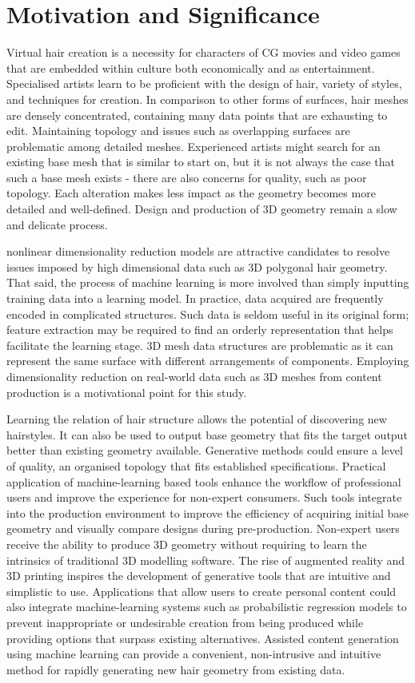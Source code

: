 \documentclass[ %
author={Dillon Keith Diep},
supervisor={Dr. Carl Henrik Ek},
degree={MEng},
title={ART-CG Hair:},
subtitle={Assisted Real-time Content Generation of Stylised Virtual Hair},
type={Research},
year={2017} ]{dissertation}
\begin{document}
\section{Motivation and Significance}
Virtual hair creation is a necessity for characters of CG movies and video games that are embedded within culture both economically and as entertainment. Specialised artists learn to be proficient with the design of hair, variety of styles, and techniques for creation. In comparison to other forms of surfaces, hair meshes are densely concentrated, containing many data points that are exhausting to edit. Maintaining topology and issues such as overlapping surfaces are problematic among detailed meshes. Experienced artists might search for an existing base mesh that is similar to start on, but it is not always the case that such a base mesh exists - there are also concerns for quality, such as poor topology. Each alteration makes less impact as the geometry becomes more detailed and well-defined. Design and production of 3D geometry remain a slow and delicate process.

nonlinear dimensionality reduction models are attractive candidates to resolve issues imposed by high dimensional data such as 3D polygonal hair geometry. That said, the process of machine learning is more involved than simply inputting training data into a learning model. In practice, data acquired are frequently encoded in complicated structures. Such data is seldom useful in its original form; feature extraction may be required to find an orderly representation that helps facilitate the learning stage. 3D mesh data structures are problematic as it can represent the same surface with different arrangements of components. Employing dimensionality reduction on real-world data such as 3D meshes from content production is a motivational point for this study.

Learning the relation of hair structure allows the potential of discovering new hairstyles.  It can also be used to output base geometry that fits the target output better than existing geometry available. Generative methods could ensure a level of quality, an organised topology that fits established specifications. Practical application of machine-learning based tools enhance the workflow of professional users and improve the experience for non-expert consumers. Such tools integrate into the production environment to improve the efficiency of acquiring initial base geometry and visually compare designs during pre-production. Non-expert users receive the ability to produce 3D geometry without requiring to learn the intrinsics of traditional 3D modelling software. The rise of augmented reality and 3D printing inspires the development of generative tools that are intuitive and simplistic to use. Applications that allow users to create personal content could also integrate machine-learning systems such as probabilistic regression models to prevent inappropriate or undesirable creation from being produced while providing options that surpass existing alternatives. Assisted content generation using machine learning can provide a convenient, non-intrusive and intuitive method for rapidly generating new hair geometry from existing data.
\end{document}
